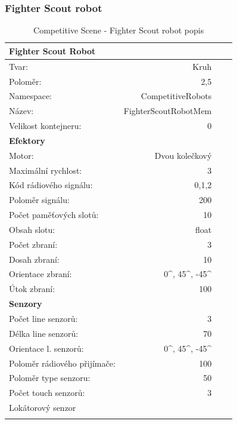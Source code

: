\subsubsection{Fighter Scout robot}
\par  
\begin{table}[h]\centering
	\begin{tabular}{l@{\hspace{1.0cm}}D{.}{,}{2.2}D{.}{,}{2.2}D{.}{,}{2.3}}
		\toprule
		\textbf{Fighter Scout Robot} \\
		\midrule
		Tvar: & Kruh\\
		Poloměr: & 2,5\\
		Namespace: & CompetitiveRobots\\
		Název: & FighterScoutRobotMem \\
		Velikost kontejneru: & 0\\
		\midrule
		\textbf{Efektory} \\
		\midrule
		Motor: & Dvou kolečkový \\
		Maximální rychlost: & 3 \\
		Kód rádiového signálu: & 0,1,2\\
		Poloměr signálu: & 200\\
		Počet paměťových slotů: &10 \\
		Obsah slotu: & float\\
		Počet zbraní: & 3\\
		Dosah zbraní: & 10\\
		Orientace zbraní: &  0^\circ, 45^\circ, -45^\circ\\
		Útok zbraní: & 100\\
		\midrule
		\textbf{Senzory} \\
		\midrule
		Počet line senzorů: &  3\\
		Délka line senzorů: & 70\\
		Orientace l. senzorů: & 0^\circ, 45^\circ, -45^\circ\\
		Poloměr rádiového přijímače: & 100 \\
		Poloměr type senzoru: & 50\\
		Počet touch senzorů: & 3 \\  
		Lokátorový senzor\\ 
		\bottomrule
	\end{tabular}
	\caption{Competitive Scene - Fighter Scout robot popis }
	\label{tab04:CompetiveScout}
\end{table}
\clearpage
